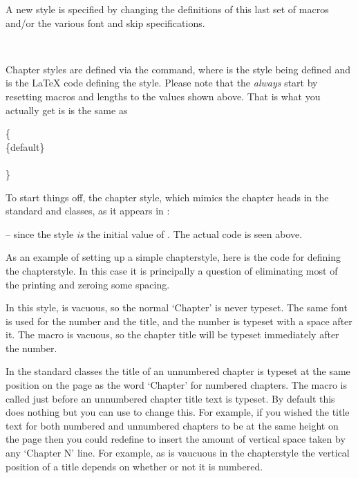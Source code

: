     A new style is specified by changing the definitions of this last set of 
macros and/or the various font and skip specifications.

\begin{syntax}
\cmd{\makechapterstyle} \\
\end{syntax}
Chapter styles are defined via the \cmd{\makechapterstyle} command, where
 is the style being defined and  is the LaTeX code 
defining the style. Please note that the  \emph{always}
start by resetting macros and lengths to the values shown above. That
is what you actually get is is the same as
\begin{syntax}
\cmd{\makechapterstyle}\{\\
  \cmd{\chapterstyle}\{default\}\\
  \\
\} 
\end{syntax}



    To start things off,  the  chapter
style, which mimics the chapter heads in the standard  and 
 classes, as it appears in :
\begin{lcode}
\end{lcode}
-- since the  style \emph{is} the initial value of
\cmd{\makechapterstyle}. The actual code is seen above. 



    As an example of setting up a simple chapterstyle, here is the code for 
defining the  chapterstyle. In this case it is principally
a question of eliminating most of the printing and zeroing some spacing.
\begin{lcode}
\end{lcode}
In this style, \cmd{\printchaptername} is vacuous, so the normal `Chapter'
is never typeset. The same font is used for the number and the title, and
the number is typeset with a space after it. The macro \cmd{\afterchapternum}
is vacuous, so the chapter title will be typeset immediately after the number.

    In the standard classes the title of an unnumbered chapter is typeset
at the same position on the page as the word `Chapter' for numbered chapters.
The macro \cmd{\printchapternonum} is called just before an unnumbered 
chapter title text is typeset. By default this does nothing but you can use
\cmd{\renewcommand} to change this. For example, if you wished the title
text for both numbered and unnumbered chapters to be at the same height on
the page then you could redefine \cmd{\printchapternonum} to insert
the amount of vertical space taken by any `Chapter N' line. For example,
as \cmd{\printchapternonum} is vaucuous in the  chapterstyle
the vertical position of a title depends on whether or not it is numbered.

